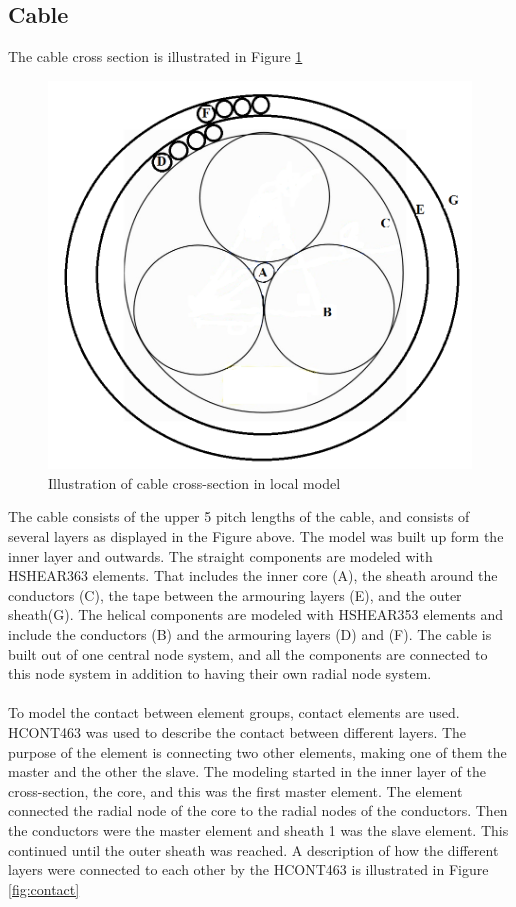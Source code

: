\subsection{Cable}
The cable cross section is illustrated in Figure \ref{fig:crosspro}
\begin{figure}[H]
\centering
\includegraphics[scale=0.5]{figures/cross2}
\caption [$\; \:$ Cable cross-section in local model]{Illustration of cable cross-section in local model}
 \label{fig:crosspro}
\end{figure}
\noindent The cable consists of the upper 5 pitch lengths of the cable, and consists of several layers as displayed in the Figure above. The model was built up form the inner layer and outwards. 
The straight components are modeled with HSHEAR363 elements. That includes the inner core (A), the sheath around the conductors (C), the tape between the armouring layers (E), and the outer sheath(G). The helical components are modeled with HSHEAR353 elements and include the conductors (B) and the armouring layers (D) and (F). The cable is built out of one central node system, and all the components are connected to this node system in addition to having their own radial node system.\\\\ To model the contact between element groups, contact elements are used.  HCONT463 was used to describe the contact between different layers. The purpose of the element is connecting two other elements, making one of them the master and the other the slave. The modeling started in the inner layer of the cross-section, the core, and this was the first master element. The element connected the radial node of the core to the radial nodes of the conductors. Then the conductors were the master element and sheath 1 was the slave element. This continued until the outer sheath was reached. A description of how the different layers were connected to each other by the HCONT463 is illustrated in Figure \ref{fig:contact}

